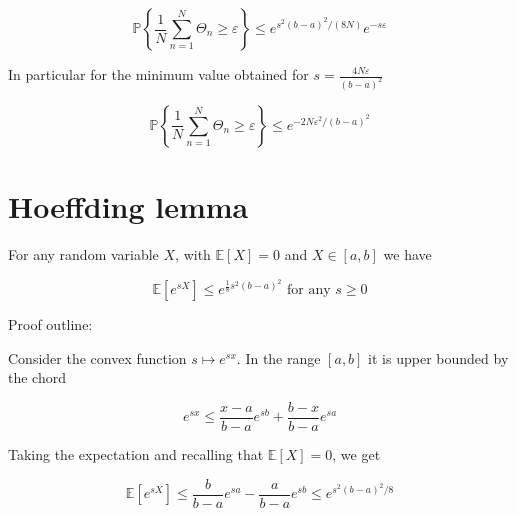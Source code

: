\documentclass[10pt]{article}
\begin{document}
$$
\mathbb{P}\left\{\frac{1}{N} \sum_{n=1}^{N} \Theta_{n} \geq \varepsilon\right\} \leq e^{s^{2}(b-a)^{2} /(8 N)} e^{-s \varepsilon}
$$

In particular for the minimum value obtained for $s=\frac{4 N \varepsilon}{(b-a)^{2}}$

$$
\mathbb{P}\left\{\frac{1}{N} \sum_{n=1}^{N} \Theta_{n} \geq \varepsilon\right\} \leq e^{-2 N \varepsilon^{2} /(b-a)^{2}}
$$

\section*{Hoeffding lemma}
For any random variable $X$, with $\mathbb{E}[X]=0$ and $X \in[a, b]$ we have

$$
\mathbb{E}\left[e^{s X}\right] \leq e^{\frac{1}{8} s^{2}(b-a)^{2}} \text { for any } s \geq 0
$$

Proof outline:

Consider the convex function $s \mapsto e^{s x}$. In the range $[a, b]$ it is upper bounded by the chord

$$
e^{s x} \leq \frac{x-a}{b-a} e^{s b}+\frac{b-x}{b-a} e^{s a}
$$

Taking the expectation and recalling that $\mathbb{E}[X]=0$, we get

$$
\mathbb{E}\left[e^{s X}\right] \leq \frac{b}{b-a} e^{s a}-\frac{a}{b-a} e^{s b} \leq e^{s^{2}(b-a)^{2} / 8}
$$
\end{document}

